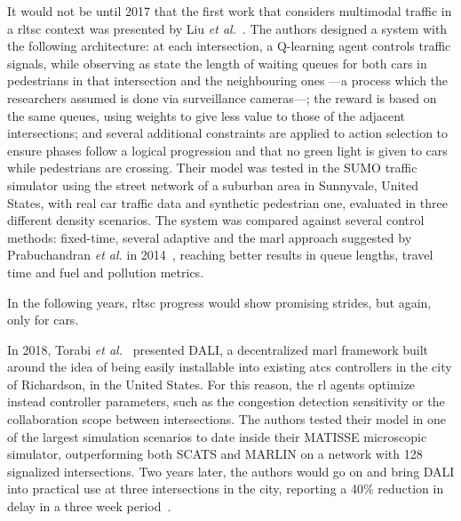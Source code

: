 It would not be until 2017 that the first work that considers multimodal traffic in a \gls{rltsc} context was presented by Liu \textit{et al.}~\cite{Liu2017}. The authors designed a system with the following architecture: at each intersection, a Q-learning agent controls traffic signals, while observing as state the length of waiting queues for both cars in pedestrians in that intersection and the neighbouring ones —a process which the researchers assumed is done via surveillance cameras—; the reward is based on the same queues, using weights to give less value to those of the adjacent intersections; and several additional constraints are applied to action selection to ensure phases follow a logical progression and that no green light is given to cars while pedestrians are crossing. Their model was tested in the SUMO traffic simulator using the street network of a suburban area in Sunnyvale, United States, with real car traffic data and synthetic pedestrian one, evaluated in three different density scenarios. The system was compared against several control methods: fixed-time, several adaptive and the \gls{marl} approach suggested by Prabuchandran \textit{et al.} in 2014~\cite{Prabuchandran2014}, reaching better results in queue lengths, travel time and fuel and pollution metrics.

\medskip 

\noindent In the following years, \gls{rltsc} progress would show promising strides, but again, only for cars.

In 2018, Torabi \textit{et al.}~\cite{Torabi2018} presented DALI, a decentralized \gls{marl} framework built around the idea of being easily installable into existing \gls{atcs} controllers in the city of Richardson, in the United States. For this reason, the \gls{rl} agents optimize instead controller parameters, such as the congestion detection sensitivity or the collaboration scope between intersections. The authors tested their model in one of the largest simulation scenarios to date inside their MATISSE microscopic simulator, outperforming both SCATS and MARLIN on a network with 128 signalized intersections. Two years later, the authors would go on and bring DALI into practical use at three intersections in the city, reporting a 40\% reduction in delay in a three week period~\cite{Torabi2020}.

